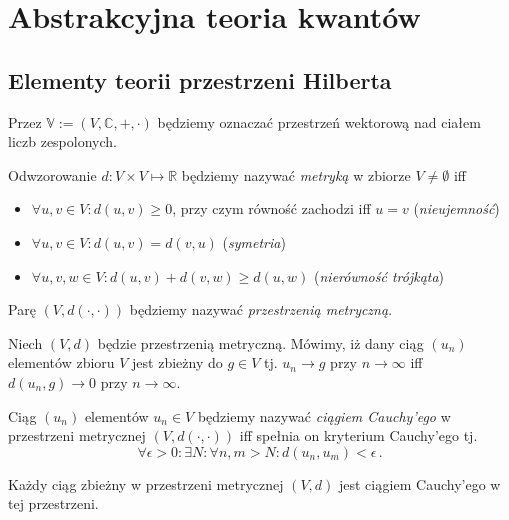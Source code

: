 \documentclass{myclass}
\author{Bartosz Hanc}
\begin{document}
\tableofcontents
\section{Abstrakcyjna teoria kwantów}

\subsection{Elementy teorii przestrzeni Hilberta}

Przez \(\mathbb{V} := (V,\mathbb{C},+,\cdot)\) będziemy oznaczać przestrzeń wektorową nad ciałem
liczb zespolonych.

\begin{definition}
Odwzorowanie \(d: V \times V \mapsto \mathbb{R}\) będziemy nazywać \textit{metryką} w zbiorze \(V
\neq \emptyset\) iff
\begin{itemize}

\item \(\forall u,v \in V : d(u,v) \geq 0\), przy czym równość zachodzi iff \(u = v\)
(\textit{nieujemność})

\item \(\forall u,v \in V : d(u,v) = d(v,u)\) (\textit{symetria})

\item \(\forall u,v,w \in V : d(u,v) + d(v,w) \geq d(u,w)\) (\textit{nierówność trójkąta})

\end{itemize}
Parę \((V,d(\cdot,\cdot))\) będziemy nazywać \textit{przestrzenią metryczną}.
\end{definition}

\begin{definition}
Niech \((V,d)\) będzie przestrzenią metryczną. Mówimy, iż dany ciąg \((u_n)\) elementów zbioru \(V\)
jest zbieżny do \(g\in V\) tj. \(u_n \to g\) przy \(n \to \infty\) iff \(d(u_n,g) \to 0\) przy \(n
\to \infty\).   
\end{definition}

\begin{definition}
Ciąg \((u_n)\) elementów \(u_n \in V\) będziemy nazywać \textit{ciągiem Cauchy'ego} w przestrzeni
metrycznej \((V,d(\cdot,\cdot))\) iff spełnia on kryterium Cauchy'ego tj.
\begin{equation*}
    \forall \epsilon > 0 : \exists N : \forall n,m > N : d(u_n,u_m) < \epsilon\,.
\end{equation*}  
\end{definition}

\begin{theorem}
Każdy ciąg zbieżny w przestrzeni metrycznej \((V,d)\) jest ciągiem Cauchy'ego w tej przestrzeni.
\end{theorem}
\end{document}
